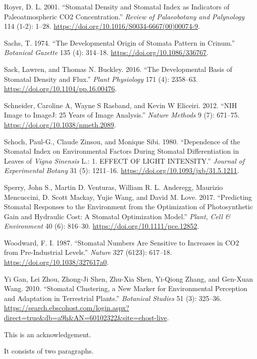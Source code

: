\documentclass[12pt,halfline,a4paper,]{ouparticle}
\newlength{\cslhangindent}
\newlength{\cslentryspacingunit} %
\newenvironment{CSLReferences}[2] %
 {%
  \setlength{\parindent}{0pt}
  \ifodd #1
  \let\oldpar\par
  \def\par{\hangindent=\cslhangindent\oldpar}
  \fi
  \setlength{\parskip}{#2\cslentryspacingunit}
 }%
 {}
\begin{document}
\begin{CSLReferences}{1}{0}
\leavevmode{}%
Royer, D. L. 2001. {``Stomatal Density and Stomatal Index as Indicators
of Paleoatmospheric {CO2} Concentration.''} \emph{Review of Palaeobotany
and Palynology} 114 (1-2): 1--28.
\url{https://doi.org/10.1016/S0034-6667(00)00074-9}.

\leavevmode{}%
Sachs, T. 1974. {``The {Developmental} {Origin} of {Stomata} {Pattern}
in {Crinum}.''} \emph{Botanical Gazette} 135 (4): 314--18.
\url{https://doi.org/10.1086/336767}.

\leavevmode{}%
Sack, Lawren, and Thomas N. Buckley. 2016. {``The {Developmental}
{Basis} of {Stomatal} {Density} and {Flux}.''} \emph{Plant Physiology}
171 (4): 2358--63. \url{https://doi.org/10.1104/pp.16.00476}.

\leavevmode{}%
Schneider, Caroline A, Wayne S Rasband, and Kevin W Eliceiri. 2012.
{``{NIH} {Image} to {ImageJ}: 25 Years of Image Analysis.''}
\emph{Nature Methods} 9 (7): 671--75.
\url{https://doi.org/10.1038/nmeth.2089}.

\leavevmode{}%
Schoch, Paul-G., Claude Zinsou, and Monique Sibi. 1980. {``Dependence of
the {Stomatal} {Index} on {Environmental} {Factors} During {Stomatal}
{Differentiation} in {Leaves} of \emph{{Vigna} Sinensis} {L}.: 1.
{EFFECT} {OF} {LIGHT} {INTENSITY}.''} \emph{Journal of Experimental
Botany} 31 (5): 1211--16. \url{https://doi.org/10.1093/jxb/31.5.1211}.

\leavevmode{}%
Sperry, John S., Martin D. Venturas, William R. L. Anderegg, Maurizio
Mencuccini, D. Scott Mackay, Yujie Wang, and David M. Love. 2017.
{``Predicting Stomatal Responses to the Environment from the
Optimization of Photosynthetic Gain and Hydraulic Cost: {A} Stomatal
Optimization Model.''} \emph{Plant, Cell \& Environment} 40 (6):
816--30. \url{https://doi.org/10.1111/pce.12852}.

\leavevmode{}%
Woodward, F. I. 1987. {``Stomatal Numbers Are Sensitive to Increases in
{CO2} from Pre-Industrial Levels.''} \emph{Nature} 327 (6123): 617--18.
\url{https://doi.org/10.1038/327617a0}.

\leavevmode{}%
Yi Gan, Lei Zhou, Zhong-Ji Shen, Zhu-Xia Shen, Yi-Qiong Zhang, and
Gen-Xuan Wang. 2010. {``Stomatal Clustering, a New Marker for
Environmental Perception and Adaptation in Terrestrial Plants.''}
\emph{Botanical Studies} 51 (3): 325--36.
\url{https://search.ebscohost.com/login.aspx?direct=true\&db=a9h\&AN=60102322\&site=ehost-live}.

\end{CSLReferences}


\begin{notes}[Acknowledgements]
This is an acknowledgement.

It consists of two paragraphs.
\end{notes}
\end{document}
